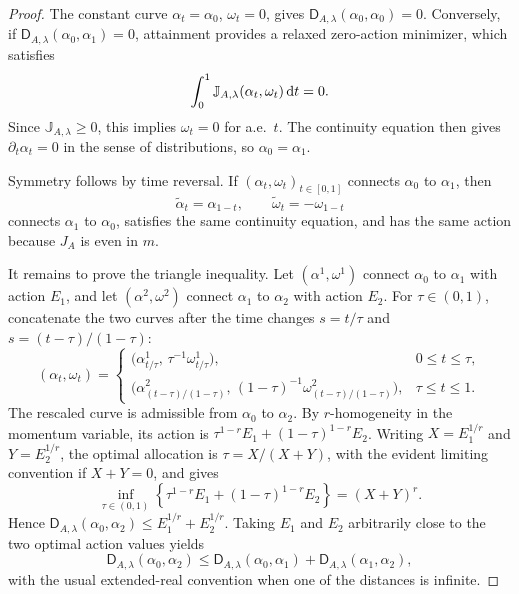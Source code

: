 \begin{proof}
	The constant curve \(\alpha_t=\alpha_0\), \(\omega_t=0\), gives \(\mathsf D_{A,\lambda}(\alpha_0,\alpha_0)=0\). Conversely, if \(\mathsf D_{A,\lambda}(\alpha_0,\alpha_1)=0\), attainment provides a relaxed zero-action minimizer, which satisfies
	\[
		\int_0^1 \mathbb J_{A,\lambda}(\alpha_t,\omega_t)\,\mathrm{d} t=0.
	\]
	Since \(\mathbb J_{A,\lambda}\geq0\), this implies \(\omega_t=0\) for a.e.\ \(t\). The continuity equation then gives \(\partial_t\alpha_t=0\) in the sense of distributions, so \(\alpha_0=\alpha_1\).

	Symmetry follows by time reversal. If \((\alpha_t,\omega_t)_{t\in[0,1]}\) connects \(\alpha_0\) to \(\alpha_1\), then
	\[
		\widetilde\alpha_t=\alpha_{1-t},
		\qquad
		\widetilde\omega_t=-\omega_{1-t}
	\]
	connects \(\alpha_1\) to \(\alpha_0\), satisfies the same continuity equation, and has the same action because \(J_A\) is even in \(m\).

	It remains to prove the triangle inequality. Let \((\alpha^1,\omega^1)\) connect \(\alpha_0\) to \(\alpha_1\) with action \(E_1\), and let \((\alpha^2,\omega^2)\) connect \(\alpha_1\) to \(\alpha_2\) with action \(E_2\). For \(\tau\in(0,1)\), concatenate the two curves after the time changes \(s=t/\tau\) and \(s=(t-\tau)/(1-\tau)\):
	\[
		(\alpha_t,\omega_t)=
		\begin{cases}
			\bigl(\alpha^1_{t/\tau},\,\tau^{-1}\omega^1_{t/\tau}\bigr), & 0\leq t\leq \tau,\\[.2em]
			\bigl(\alpha^2_{(t-\tau)/(1-\tau)},\,(1-\tau)^{-1}\omega^2_{(t-\tau)/(1-\tau)}\bigr), & \tau\leq t\leq1.
		\end{cases}
	\]
	The rescaled curve is admissible from \(\alpha_0\) to \(\alpha_2\). By \(r\)-homogeneity in the momentum variable, its action is
	\(\tau^{1-r}E_1+(1-\tau)^{1-r}E_2\).
	Writing \(X=E_1^{1/r}\) and \(Y=E_2^{1/r}\), the optimal allocation is \(\tau=X/(X+Y)\), with the evident limiting convention if \(X+Y=0\), and gives
	\[
		\inf_{\tau\in(0,1)}
		\left\{\tau^{1-r}E_1+(1-\tau)^{1-r}E_2\right\}
		=
		(X+Y)^r.
	\]
	Hence \(\mathsf D_{A,\lambda}(\alpha_0,\alpha_2)\leq E_1^{1/r}+E_2^{1/r}\). Taking \(E_1\) and \(E_2\) arbitrarily close to the two optimal action values yields
	\[
		\mathsf D_{A,\lambda}(\alpha_0,\alpha_2)
		\leq
		\mathsf D_{A,\lambda}(\alpha_0,\alpha_1)+\mathsf D_{A,\lambda}(\alpha_1,\alpha_2),
	\]
	with the usual extended-real convention when one of the distances is infinite.
\end{proof}

